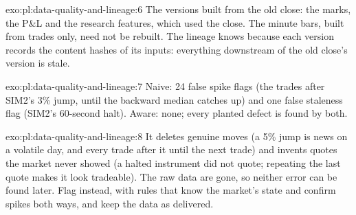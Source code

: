 \begin{solution}{exo:pl:data-quality-and-lineage:6}
The versions built from the old close: the marks, the P\&L and the research features, which used the close. The minute bars, built from
trades only, need not be rebuilt. The lineage knows because each version records the content hashes of its inputs: everything
downstream of the old close's version is stale.
\end{solution}

\begin{solution}{exo:pl:data-quality-and-lineage:7}
Naive: 24 false spike flags (the trades after SIM2's 3\% jump, until the backward median catches up) and one false staleness flag
(SIM2's 60-second halt). Aware: none; every planted defect is found by both.
\end{solution}

\begin{solution}{exo:pl:data-quality-and-lineage:8}
It deletes genuine moves (a 5\% jump is news on a volatile day, and every trade after it until the next trade) and invents quotes
the market never showed (a halted instrument did not quote; repeating the last quote makes it look tradeable). The raw data are gone,
so neither error can be found later. Flag instead, with rules that know the market's state and confirm spikes both ways, and keep
the data as delivered.
\end{solution}

